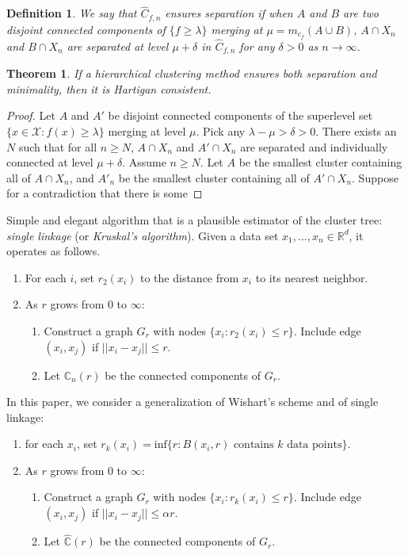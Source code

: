 \documentclass{article}
\newtheorem{theorem}{Theorem}
\newtheorem{definition}{Definition}
\begin{document}
\begin{definition}
We say that ${\hat C}_{f,n}$ ensures separation if when $A$ and $B$ are two disjoint connected components of $\{f \geq \lambda\}$ merging at $\mu = m_{c_f}(A \cup B)$, $A \cap X_n$ and $B \cap X_n$ are separated at level $\mu + \delta$ in ${\hat C}_{f,n}$ for any $\delta > 0$ as $n \rightarrow \infty$.
\end{definition}

\begin{theorem}
If a hierarchical clustering method ensures both separation and minimality, then it is Hartigan consistent.
\end{theorem}

\begin{proof}
Let $A$ and $A'$ be disjoint connected components of the superlevel set $\{x \in \mathcal{X} : f(x) \geq \lambda\}$ merging at level $\mu$. Pick any $\lambda - \mu > \delta > 0$. There exists an $N$ such that for all $n \geq N$, $A \cap X_n$ and $A' \cap X_n$ are separated and individually connected at level $\mu + \delta$. Assume $n \geq N$. Let $A$ be the smallest cluster containing all of $A \cap X_n$, and $A'_n$ be the smallest cluster containing all of $A' \cap X_n$. Suppose for a contradiction that there is some 
\end{proof}


Simple and elegant algorithm that is a plausible estimator of the cluster tree: \emph{single linkage} (or \emph{Kruskal's algorithm}). Given a data set $x_1, ... , x_n \in \mathbb{R}^d$, it operates as follows.

\begin{enumerate}
    \item For each $i$, set $r_2(x_i)$ to the distance from $x_i$ to its nearest neighbor.
    \item As $r$ grows from $0$ to $\infty$:
    \begin{enumerate}
        \item Construct a graph $G_r$ with nodes $\{x_i : r_2(x_i) \leq r\}$. Include edge $(x_i, x_j)$ if $||x_i - x_j|| \leq r$.
        \item Let $\mathbb{C}_n(r)$ be the connected components of $G_r$.
    \end{enumerate}
\end{enumerate}

In this paper, we consider a generalization of Wishart's scheme and of single linkage:

\begin{enumerate}
    \item for each $x_i$, set $r_k(x_i) = \text{inf} \{ r:B(x_i, r) \text{ contains } k \text{ data points} \}$.
    \item As $r$ grows from $0$ to $\infty$:
    \begin{enumerate}
        \item Construct a graph $G_r$ with nodes $\{x_i : r_k(x_i) \leq r\}$. Include edge $(x_i, x_j)$ if $||x_i - x_j|| \leq \alpha r$.
        \item Let $\hat{\mathbb{C}}(r)$ be the connected components of $G_r$.
    \end{enumerate}
\end{enumerate}
\end{document}
